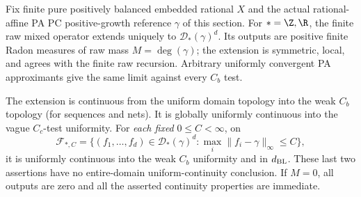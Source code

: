 \begin{theorem}\label{raw-extension}
Fix finite pure positively balanced embedded rational $X$ and the actual
rational-affine PA PC positive-growth reference $\gamma$ of this section.
For $*=\Z,\R$, the finite raw mixed operator extends uniquely to
$\mathcal D_*(\gamma)^d$. Its outputs are positive finite Radon measures
of raw mass $M=\deg(\gamma)$; the extension is symmetric, local, and
agrees with the finite raw recursion. Arbitrary uniformly convergent PA
approximants give the same limit against every $C_b$ test.

The extension is continuous from the uniform domain topology into the
weak $C_b$ topology (for sequences and nets). It is globally uniformly
continuous into the vague $C_c$-test uniformity. For \emph{each fixed}
$0\leq C<\infty$, on
\[
 \mathcal F_{*,C}=\{(f_1,\ldots,f_d)\in\mathcal D_*(\gamma)^d:
                   \max_i\|f_i-\gamma\|_\infty\leq C\},
\]
it is uniformly continuous into the weak $C_b$ uniformity and in
$d_{\rm BL}$. These last two assertions have no entire-domain
uniform-continuity conclusion. If $M=0$, all outputs are zero and
all the asserted continuity properties are immediate.
\end{theorem}
